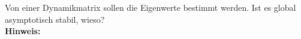 \begin{question}[section=2,name={Eigenwerte einer Dynamikmatrix},difficulty=5,type=mdl,tags={}]
	Von einer Dynamikmatrix sollen die Eigenwerte bestimmt werden. Ist es global asymptotisch stabil, wieso?
	\\ \textbf{Hinweis:}\\
	
\end{question}
\begin{solution}
	
\end{solution}